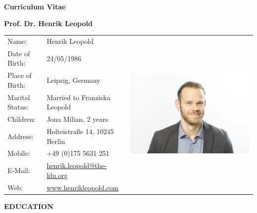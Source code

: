 \documentclass[titlepage]{article}
\newcommand{\heading}[1] {
\vspace*{0.7cm}\noindent \textcolor{myred}{\large{\textbf{\uppercase{{#1}}}}} \\[-5pt]
\noindent\makebox[\linewidth]{\rule{\textwidth}{0.4pt}\vspace*{0.2cm}}
}
\begin{document}


\centerline{\huge{\textcolor{myred}{\textbf{Curriculum Vitae}}}}
\vspace{0.5cm}
\centerline{\Large{\textbf{Prof. Dr. Henrik Leopold}}}
\vspace{1.5cm}

\begin{tabular}{P{3cm}P{5.0cm}l}
Name:					&  Henrik Leopold  &  \\
Date of Birth: 		& 24/05/1986 \\
Place of Birth: 		& Leipzig, Germany \\
Marital Status: 		& Married to Franziska Leopold \\
Children:				& Jona Milian, 2 years \\
Address:				& Holteistraße 14, 10245 Berlin \\
Mobile: 				& +49 (0)175 5631 251 \\
E-Mail: 				& \href{mailto:henrik.leopold@the-klu.org}{henrik.leopold@the-klu.org} \\
Web:						& \href{www.henrikleopold.com}{www.henrikleopold.com} \\
\end{tabular}

\heading{Education}
\end{document}
